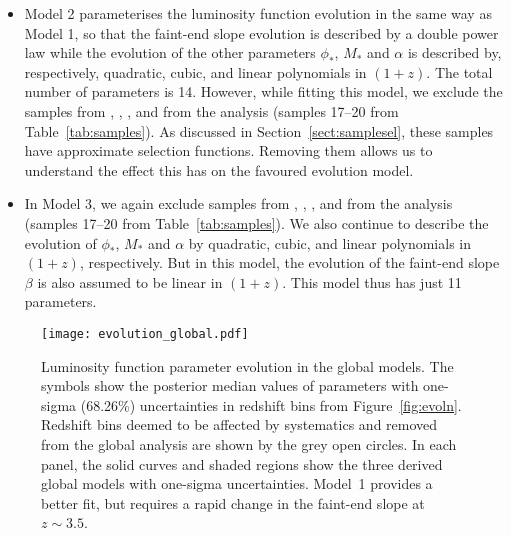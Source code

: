 \documentclass[fleqn,usenatbib]{mnras}
\begin{document}
\begin{itemize}
\item Model 2 parameterises the luminosity function evolution in the
  same way as Model 1, so that the faint-end slope evolution is
  described by a double power law while the evolution of the other
  parameters $\phi_*$, $M_*$ and $\alpha$ is described by,
  respectively, quadratic, cubic, and linear polynomials in $(1+z)$.
  The total number of parameters is 14.  However, while fitting this
  model, we exclude the samples from \citet{2015AA...578A..83G},
  \citet{2011Natur.474..616M}, \citet{2015ApJ...801L..11V}, and
  \citet{2018Natur.553..473B} from the analysis (samples 17--20 from
  Table~\ref{tab:samples}).  As discussed in
  Section~\ref{sect:samplesel}, these samples have approximate
  selection functions.  Removing them allows us to understand the
  effect this has on the favoured evolution model.

\item In Model 3, we again exclude samples from
  \citet{2015AA...578A..83G}, \citet{2011Natur.474..616M},
  \citet{2015ApJ...801L..11V}, and \citet{2018Natur.553..473B} from
  the analysis (samples 17--20 from Table~\ref{tab:samples}).  We also
  continue to describe the evolution of $\phi_*$, $M_*$ and $\alpha$
  by quadratic, cubic, and linear polynomials in $(1+z)$,
  respectively.  But in this model, the evolution of the faint-end
  slope $\beta$ is also assumed to be linear in $(1+z)$.  This model
  thus has just 11 parameters.
\end{itemize}

\begin{figure*}
  \begin{center}
    \texttt{[image: evolution\_global.pdf]}
  \end{center}
  \caption{Luminosity function parameter evolution in the global
    models.  The symbols show the posterior median values of
    parameters with one-sigma (68.26\%) uncertainties in redshift bins
    from Figure~\ref{fig:evoln}.  Redshift bins deemed to be affected
    by systematics and removed from the global analysis are shown by
    the grey open circles.  In each panel, the solid curves and shaded
    regions show the three derived global models with one-sigma
    uncertainties.  Model~1 provides a better fit, but requires a
    rapid change in the faint-end slope at $z\sim 3.5$.}
  \label{fig:evoln_global}
\end{figure*}
\end{document}

